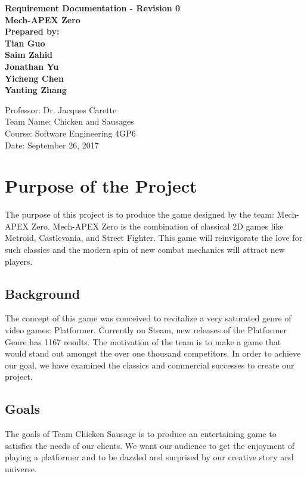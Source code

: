 \documentclass{article}
\begin{document}
	\begin{center}
        \vspace*{1cm}
        \textbf{\Large Requirement Documentation - Revision 0}
        \vspace{0.5cm}
        \textbf{\Large  \\Mech-APEX Zero}
        \vspace{1cm}
        \textbf{\\Prepared by: \\ Tian Guo\\Saim Zahid\\Jonathan Yu\\ Yicheng Chen \\Yanting Zhang }
        \vfill
        \vspace{0.8cm}
        \begin{flushright}
        Professor: Dr. Jacques Carette\\
        Team Name: Chicken and Sausages\\
        Course: Software Engineering 4GP6\\
        Date: September 26, 2017
        \end{flushright}
    \end{center}
	\newpage
	\tableofcontents

	\section{Purpose of the Project}
	The purpose of this project is to produce the game designed by the team: Mech-APEX Zero. Mech-APEX Zero is the combination of classical 2D games like Metroid, Castlevania, and Street Fighter. This game will reinvigorate the love for such classics and the modern spin of new combat mechanics will attract new players.

	\subsection{Background}
	The concept of this game was conceived to revitalize a very saturated genre of video games: Platformer. Currently on Steam, new releases of the Platformer Genre has 1167 results. The motivation of the team is to make a game that would stand out amongst the over one thousand competitors. In order to achieve our goal, we have examined the classics and commercial successes to create our project.

	\subsection{Goals}
	The goals of Team Chicken Sausage is to produce an entertaining game to satisfies the needs of our clients. We want our audience to get the enjoyment of playing a platformer and to be dazzled and surprised by our creative story and universe.
\end{document}
